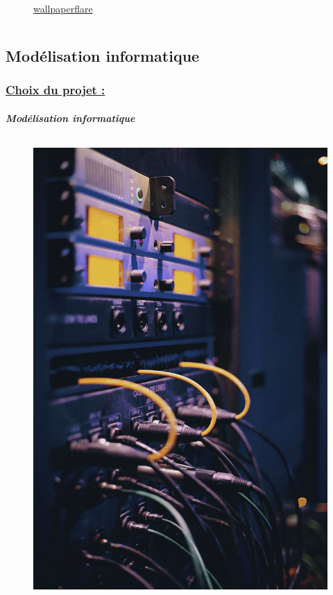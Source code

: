 \documentclass[10pt]{beamer}
\begin{document}
\begin{frame}
\begin{columns}[t]
\begin{column}{5cm}
\begin{figure}
   					\caption{\href{https://www.wallpaperflare.com/city-portrait-buildings-skyscraper-tower-tall-toronto-wallpaper-eafsn}{wallpaperflare}}
				\end{figure}
			 \end{column}
 		\end{columns}
	\end{frame}
	\subsection{Mod\'elisation informatique}
	\begin{frame}
		\frametitle{\uline{Choix du projet :}}
		\framesubtitle{\textit{Mod\'elisation informatique}}
		
		\begin{columns}[t]
  			\begin{column}{5cm} 
 				\begin{figure}
   					\includegraphics[scale = 0.125]{Images/cables.jpg}

\end{figure}
\end{column}
\end{columns}
\end{frame}
\end{document}
